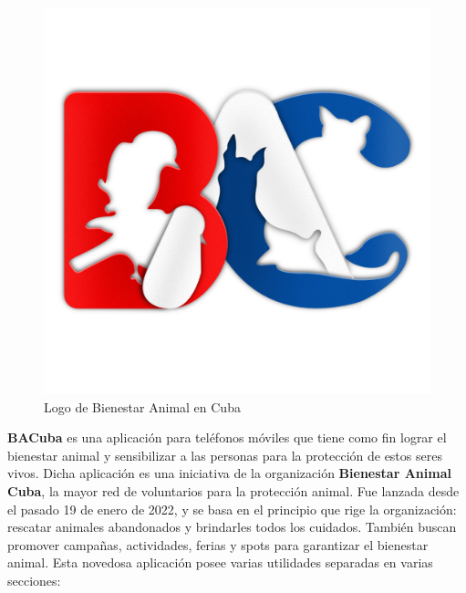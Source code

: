 \begin{figure}[h!]
\begin{center}
\includegraphics[scale=0.09]{Graphics/images/LogodeBienestarAnimalenCuba.png}
\caption{Logo de Bienestar Animal en Cuba}
\label{fig:bac}

\end{center}
\end{figure}

\textbf{ BACuba}  es una aplicación para teléfonos móviles que tiene como fin lograr el bienestar animal y sensibilizar a las personas para la protección de estos seres vivos. Dicha aplicación es una iniciativa de la organización \textbf{Bienestar Animal Cuba}, la mayor red de voluntarios para la protección animal. Fue lanzada desde el pasado 19 de enero de 2022, y se basa en el principio que rige la organización: rescatar animales abandonados y brindarles todos los cuidados. También buscan promover campañas, actividades, ferias y spots para garantizar el bienestar animal. Esta novedosa aplicación posee varias utilidades separadas en varias secciones:

